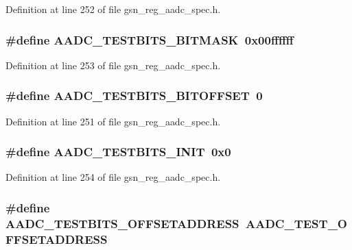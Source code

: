 Definition at line 252 of file gsn\_\-reg\_\-aadc\_\-spec.h.

\hypertarget{a00543_a4c061c978799be60e8115cc81c689770}{
\subsubsection[{AADC\_\-TESTBITS\_\-BITMASK}]{\setlength{\rightskip}{0pt plus 5cm}\#define AADC\_\-TESTBITS\_\-BITMASK~0x00ffffff}}
\label{a00543_a4c061c978799be60e8115cc81c689770}


Definition at line 253 of file gsn\_\-reg\_\-aadc\_\-spec.h.

\hypertarget{a00543_aa58224d6d22e1317fdf907a46c04b160}{
\subsubsection[{AADC\_\-TESTBITS\_\-BITOFFSET}]{\setlength{\rightskip}{0pt plus 5cm}\#define AADC\_\-TESTBITS\_\-BITOFFSET~0}}
\label{a00543_aa58224d6d22e1317fdf907a46c04b160}


Definition at line 251 of file gsn\_\-reg\_\-aadc\_\-spec.h.

\hypertarget{a00543_a9c5163e406be424ebd203bd972d18d76}{
\subsubsection[{AADC\_\-TESTBITS\_\-INIT}]{\setlength{\rightskip}{0pt plus 5cm}\#define AADC\_\-TESTBITS\_\-INIT~0x0}}
\label{a00543_a9c5163e406be424ebd203bd972d18d76}


Definition at line 254 of file gsn\_\-reg\_\-aadc\_\-spec.h.

\hypertarget{a00543_aaff971f93d6718ee2a9407fdf2d0dc6d}{
\subsubsection[{AADC\_\-TESTBITS\_\-OFFSETADDRESS}]{\setlength{\rightskip}{0pt plus 5cm}\#define AADC\_\-TESTBITS\_\-OFFSETADDRESS~AADC\_\-TEST\_\-OFFSETADDRESS}}
\label{a00543_aaff971f93d6718ee2a9407fdf2d0dc6d}


